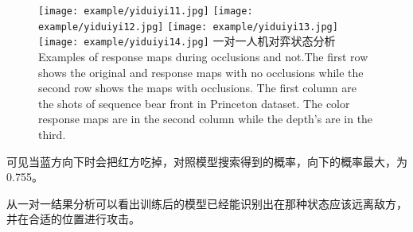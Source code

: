 \begin{figure}[!htpb]
	\centering
	{\texttt{[image: example/yiduiyi11.jpg]}}
	\hspace{0.5em}
	{\texttt{[image: example/yiduiyi12.jpg]}}
	\newline
	\centering
	{\texttt{[image: example/yiduiyi13.jpg]}}
	\hspace{0.5em}
	{\texttt{[image: example/yiduiyi14.jpg]}}
	\bicaption
	{一对一人机对弈状态分析}
	{Examples of response maps during occlusions and not.The first row shows the original and response maps with no occlusions while the second row shows the maps with occlusions. The first column are the shots of sequence bear front in Princeton dataset. The color response maps are in the second column while the depth’s are in the third.}
	\label{fig2:yiduiyi11-14}
\end{figure}
可见当蓝方向下时会把红方吃掉，对照模型搜索得到的概率，向下的概率最大，为0.755。

从一对一结果分析可以看出训练后的模型已经能识别出在那种状态应该远离敌方，并在合适的位置进行攻击。



